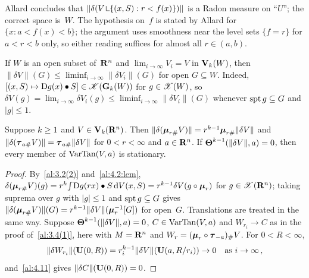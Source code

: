 \begin{remark}
    \label{rem:4.10}
    Allard concludes that $\|\delta(V \restrict \{ (x,S) : r < f(x) \})\|$ is a Radon measure on
    ``$U$''; the correct space is~$W$. The hypothesis on~$f$ is stated by Allard for $\{ x : a <
    f(x) < b \}$; the argument uses smoothness near the level sets $\{ f = r \}$ for $a < r < b$
    only, so either reading suffices for almost all $r \in (a,b)$.
\end{remark}

\begin{remark}
    \label{al:4.11}
    If $W$ is an open subset of~$\mathbf{R}^{n}$ and $\lim_{i \to \infty} V_i = V$ in $\mathbf{V}_{k}(W)$,
    then $\|\delta V\|(G) \le \liminf_{i \to \infty} \|\delta V_i\|(G)$ for open $G \subseteq W$.
    Indeed, $[(x,S) \mapsto \mathrm{D} g(x) \bullet S] \in \mathscr{K}(\mathbf{G}_{k}(W))$ for $g \in \mathscr{X}(W)$, so
    $\delta V(g) = \lim_{i \to \infty} \delta V_i(g) \le \liminf_{i \to \infty} \|\delta V_i\|(G)$
    whenever $\operatorname{spt} g \subseteq G$ and $|g| \le 1$.
\end{remark}

\begin{lemma}
    \label{al:4.12}
    Suppose $k \ge 1$ and $V \in \mathbf{V}_{k}(\mathbf{R}^{n})$. Then $\|\delta(\boldsymbol{\mu}_{r \#} V)\| =
    r^{k-1} \boldsymbol{\mu}_{r \#} \|\delta V\|$ and $\|\delta(\boldsymbol{\tau}_{a \#} V)\| = \boldsymbol{\tau}_{a \#} \|\delta
    V\|$ for $0 < r < \infty$ and $a \in \mathbf{R}^{n}$. If $\boldsymbol{\Theta}^{k-1}(\|\delta V\|,a) = 0$,
    then every member of $\operatorname{VarTan}(V,a)$ is stationary.
\end{lemma}

\begin{proof}
    By~\ref{al:3.2(2)} and~\ref{al:4.2:lem}, $\delta(\boldsymbol{\mu}_{r \#} V)(g) = r^{k} {\textstyle\int_{}^{}} \mathrm{D}
    g(r x) \bullet S \,\mathrm{d} V(x,S) = r^{k-1} \delta V(g \circ \boldsymbol{\mu}_{r})$ for $g \in
    \mathscr{X}(\mathbf{R}^{n})$; taking suprema over $g$ with $|g| \le 1$ and $\operatorname{spt} g \subseteq G$ gives
    $\|\delta(\boldsymbol{\mu}_{r \#} V)\|(G) = r^{k-1} \|\delta V\|(\boldsymbol{\mu}_{r}^{-1}[G])$ for open~$G$.
    Translations are treated in the same way. Suppose $\boldsymbol{\Theta}^{k-1}(\|\delta V\|,a) = 0$,
    $C \in \operatorname{VarTan}(V,a)$ and $W_{r_i} \to C$ as in the proof of~\ref{al:3.4(1)}, here with $M =
    \mathbf{R}^{n}$ and $W_r = (\boldsymbol{\mu}_{r} \circ \boldsymbol{\tau}_{-a})_\# V$. For $0 < R < \infty$,
    \begin{displaymath}
        \|\delta W_{r_i}\|(\mathbf{U}(0,R)) = r_i^{k-1} \|\delta V\|(\mathbf{U}(a,R/r_i)) \to 0
        \quad \text{as $i \to \infty$} \,,
    \end{displaymath}
    and~\ref{al:4.11} gives $\|\delta C\|(\mathbf{U}(0,R)) = 0$.
\end{proof}


